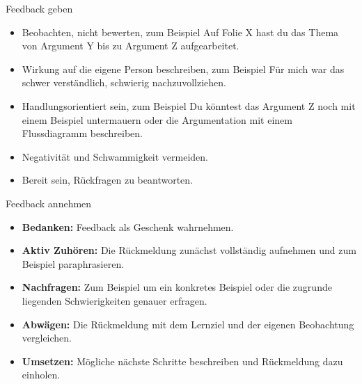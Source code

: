\documentclass[aspectratio=\BeamerAspectRatio]{beamer}
\begin{document}
\begin{frame}{Feedback geben}
\vspace{3mm}

\begin{itemize}
  \item<2-> Beobachten, nicht bewerten, zum Beispiel \glqq Auf Folie X hast du das Thema von Argument Y bis zu Argument Z aufgearbeitet\grqq.
  \item<3-> Wirkung auf die eigene Person beschreiben, zum Beispiel \glqq Für mich war das schwer verständlich, schwierig nachzuvollziehen\grqq.
  \item<4-> Handlungsorientiert sein, zum Beispiel \glqq Du könntest das Argument Z noch mit einem Beispiel untermauern  oder die Argumentation mit einem Flussdiagramm beschreiben\grqq.
  \item<5-> Negativität und Schwammigkeit vermeiden.
  \item<6-> Bereit sein, Rückfragen zu beantworten.
\end{itemize}

\end{frame}

\begin{frame}{Feedback annehmen}
\vspace{3mm}
\begin{itemize}
  \item<2-> \textbf{Bedanken:} Feedback als Geschenk wahrnehmen.
  \item<3-> \textbf{Aktiv Zuhören:} Die Rückmeldung zunächst vollständig aufnehmen und zum Beispiel paraphrasieren.
  \item<4-> \textbf{Nachfragen:} Zum Beispiel um ein konkretes Beispiel oder die zugrunde liegenden Schwierigkeiten genauer erfragen.
  \item<5-> \textbf{Abwägen:} Die Rückmeldung mit dem Lernziel und der eigenen Beobachtung vergleichen.
  \item<6-> \textbf{Umsetzen:} Mögliche nächste Schritte beschreiben und Rückmeldung dazu einholen.
\end{itemize}


\end{frame}
\end{document}
